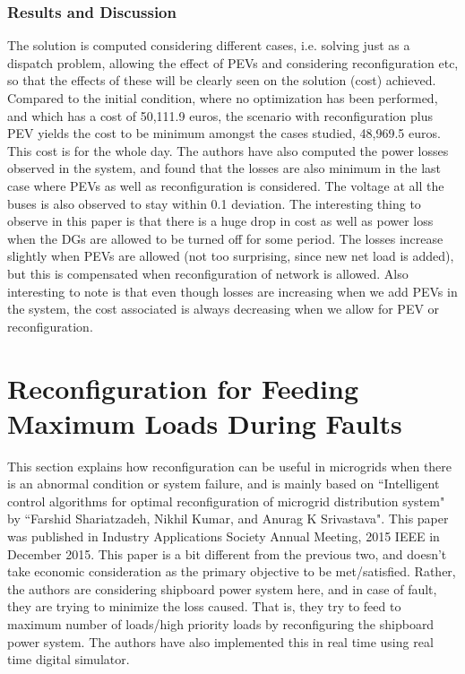 \subsubsection{Results and Discussion}
The solution is computed considering different cases, i.e. solving just as a dispatch problem, allowing the effect of PEVs and considering reconfiguration etc, so that the effects of these will be clearly seen on the solution (cost) achieved. Compared to the initial condition, where no optimization has been performed, and which has a cost of 50,111.9 euros, the scenario with reconfiguration plus PEV yields the cost to be minimum amongst the cases studied, 48,969.5 euros. This cost is for the whole day. The authors have also computed the power losses observed in the system, and found that the losses are also minimum in the last case where PEVs as well as reconfiguration is considered. The voltage at all the buses is also observed to stay within 0.1 deviation. The interesting thing to observe in this paper is that there is a huge drop in cost as well as power loss when the DGs are allowed to be turned off for some period. The losses increase slightly when PEVs are allowed (not too surprising, since new net load is added), but this is compensated when reconfiguration of network is allowed. Also interesting to note is that even though losses are increasing when we add PEVs in the system, the cost associated is always decreasing when we allow for PEV or reconfiguration.



\section{Reconfiguration for Feeding Maximum Loads During Faults}\label{ch3sec3}
This section explains how reconfiguration can be useful in microgrids when there is an abnormal condition or system failure, and is mainly based on ``Intelligent control algorithms for optimal reconfiguration of microgrid distribution system" by ``Farshid Shariatzadeh, Nikhil Kumar, and Anurag K Srivastava"\citep{Shariatzadeh2015}. This paper was published in  Industry Applications Society Annual Meeting, 2015 IEEE in December 2015. This paper is a bit different from the previous two, and doesn't take economic consideration as the primary objective to be met/satisfied. Rather, the authors are considering shipboard power system here, and in case of fault, they are trying to minimize the loss caused. That is, they try to feed to maximum number of loads/high priority loads by reconfiguring the shipboard power system. The authors have also implemented this in real time using real time digital simulator.
